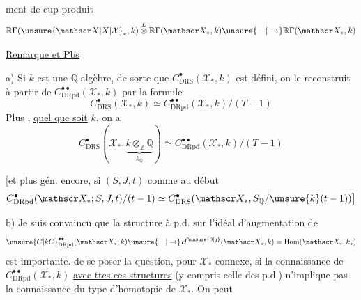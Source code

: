 %
%
ment de cup-produit
\[
\mathbb R\Gamma(\unsure{\mathscr X|X|\mathcal X}_{\ast},k)\overset{L}{\otimes}\mathbb R\Gamma(\mathscr X_\ast,k)\unsure{\text{---}|\to}\mathbb R\Gamma(\mathscr X_\ast,k)
\]

\uline{Remarque et Pbs}

a) Si $k$ est une $\mathbb Q$-algèbre, de sorte que $C^\bullet_{\mathrm{DRS}}(\mathscr X_{\ast},k)$ est défini, on le reconstruit à partir de $C^{\bullet\bullet}_{\mathrm{DRpd}}(\mathscr X_{\ast},k)$  par la formule
\[
C^\bullet_{\mathrm{DRS}}(\mathscr X_\ast,k)\simeq C^{\bullet\bullet}_{\mathrm{DRpd}}(\mathscr X_\ast,k)/(T-1)
\]
Plus , \uline{quel que soit} $k$, on a
\[
C^\bullet_{\mathrm{DRS}}(\mathscr X_\ast,\underbrace{k\otimes_{\mathbb Z}\mathbb Q}_{k_{\mathbb Q}})\simeq C^{\bullet\bullet}_{\mathrm{DRpd}}(\mathscr X_\ast,k)/(T-1)
\]

[et plus gén. encore, si $(S,J,t)$ comme au début
\[
C^\bullet_{\mathrm{DRpd}}(\mathscr X_{\ast};S,J,t)/(t-1)\simeq C^\bullet_{\mathrm{DRS}}(\mathscr X_\ast,S_{\mathbb Q}/\unsure{k} (t-1))\big]
\]

b) Je suis convaincu que la structure à p.d. sur l'idéal d'augmentation de
\[
\unsure{C|kC}^{\bullet\bullet}_{\mathrm{DRpd}}(\mathscr X_{\ast},k)\unsure{\text{---}|\to}H^{\unsure{0|q}}(\mathscr X_\ast,k)=\mathrm{Hom}(\mathscr X_{\ast},k_\ast)
\]
est importante.   de se poser la question, pour $\mathscr X_\ast$  connexe, si la connaissance de $C^{\bullet\bullet}_{\mathrm{DRpd}}(\mathscr X_\ast,k)$ \uline{avec ttes ces structures} (y compris celle des p.d.) n'implique pas la connaissance du type d'homotopie de $\mathscr X_\ast$. On peut
